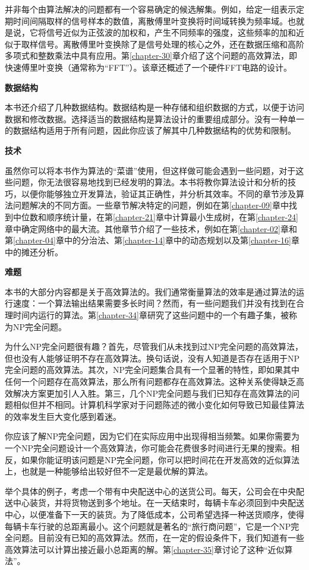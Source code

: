 \documentclass[lang=cn,newtx,10pt,scheme=chinese]{elegantbook}
\begin{document}
并非每个由算法解决的问题都有一个容易确定的候选解集。例如，给定一组表示定期时间间隔取样的信号样本的数值，离散傅里叶变换将时间域转换为频率域。也就是说，它将信号近似为正弦波的加权和，产生不同频率的强度，这些频率的加和近似于取样信号。离散傅里叶变换除了是信号处理的核心之外，还在数据压缩和高阶多项式和整数乘法中具有应用。第\ref{chapter-30}章介绍了这个问题的高效算法，即快速傅里叶变换（通常称为``FFT''）。该章还概述了一个硬件FFT电路的设计。

\textbf{数据结构}

本书还介绍了几种数据结构。数据结构是一种存储和组织数据的方式，以便于访问数据和修改数据。选择适当的数据结构是算法设计的重要组成部分。没有一种单一的数据结构适用于所有问题，因此你应该了解其中几种数据结构的优势和限制。

\textbf{技术}

虽然你可以将本书作为算法的``菜谱''使用，但这样做可能会遇到一些问题，对于这些问题，你无法很容易地找到已经发明的算法。本书将教你算法设计和分析的技巧，以便你能够独立开发算法，验证其正确性，并分析其效率。不同的章节涉及算法问题解决的不同方面。一些章节解决特定的问题，例如在第\ref{chapter-09}章中找到中位数和顺序统计量，在第\ref{chapter-21}章中计算最小生成树，在第\ref{chapter-24}章中确定网络中的最大流。其他章节介绍了一些技术，例如在第\ref{chapter-02}章和第\ref{chapter-04}章中的分治法、第\ref{chapter-14}章中的动态规划以及第\ref{chapter-16}章中的摊还分析。

\textbf{难题}

本书的大部分内容都是关于高效算法的。我们通常衡量算法的效率是通过算法的运行速度：一个算法输出结果需要多长时间？然而，有一些问题我们并没有找到在合理时间内运行的算法。第\ref{chapter-34}章研究了这些问题中的一个有趣子集，被称为NP完全问题。

为什么NP完全问题很有趣？首先，尽管我们从未找到过NP完全问题的高效算法，但也没有人能够证明不存在高效算法。换句话说，没有人知道是否存在适用于NP完全问题的高效算法。其次，NP完全问题集合具有一个显著的特性，即如果其中任何一个问题存在高效算法，那么所有问题都存在高效算法。这种关系使得缺乏高效解决方案更加引人入胜。第三，几个NP完全问题与我们已知存在高效算法的问题相似但并不相同。计算机科学家对于问题陈述的微小变化如何导致已知最佳算法的效率发生巨大变化感到着迷。

你应该了解NP完全问题，因为它们在实际应用中出现得相当频繁。如果你需要为一个NP完全问题设计一个高效算法，你可能会花费很多时间进行无果的搜索。相反，如果你能证明该问题是NP完全问题，你可以把时间花在开发高效的近似算法上，也就是一种能够给出较好但不一定是最优解的算法。

举个具体的例子，考虑一个带有中央配送中心的送货公司。每天，公司会在中央配送中心装货，并将货物送到多个地址。在一天结束时，每辆卡车必须回到中央配送中心，以便准备下一天的装货。为了降低成本，公司希望选择一种送货顺序，使得每辆卡车行驶的总距离最小。这个问题就是著名的``旅行商问题''，它是一个NP完全问题。目前没有已知的高效算法。然而，在一定的假设条件下，我们知道有一些高效算法可以计算出接近最小总距离的解。第\ref{chapter-35}章讨论了这种``近似算法''。
\end{document}
